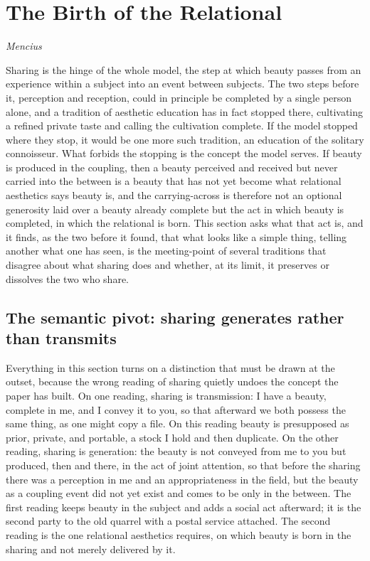 \section{The Birth of the Relational}
\label{p22:sec:sharing}

\epigraph{}{\textit{Mencius}}

\noindent
Sharing is the hinge of the whole model, the step at which beauty passes from an experience within a subject into an event between subjects. The two steps before it, perception and reception, could in principle be completed by a single person alone, and a tradition of aesthetic education has in fact stopped there, cultivating a refined private taste and calling the cultivation complete. If the model stopped where they stop, it would be one more such tradition, an education of the solitary connoisseur. What forbids the stopping is the concept the model serves. If beauty is produced in the coupling, then a beauty perceived and received but never carried into the between is a beauty that has not yet become what relational aesthetics says beauty is, and the carrying-across is therefore not an optional generosity laid over a beauty already complete but the act in which beauty is completed, in which the relational is born. This section asks what that act is, and it finds, as the two before it found, that what looks like a simple thing, telling another what one has seen, is the meeting-point of several traditions that disagree about what sharing does and whether, at its limit, it preserves or dissolves the two who share.

\subsection{The semantic pivot: sharing generates rather than transmits}
\label{p22:sub:sharing-pivot}

Everything in this section turns on a distinction that must be drawn at the outset, because the wrong reading of sharing quietly undoes the concept the paper has built. On one reading, sharing is transmission: I have a beauty, complete in me, and I convey it to you, so that afterward we both possess the same thing, as one might copy a file. On this reading beauty is presupposed as prior, private, and portable, a stock I hold and then duplicate. On the other reading, sharing is generation: the beauty is not conveyed from me to you but produced, then and there, in the act of joint attention, so that before the sharing there was a perception in me and an appropriateness in the field, but the beauty as a coupling event did not yet exist and comes to be only in the between. The first reading keeps beauty in the subject and adds a social act afterward; it is the second party to the old quarrel with a postal service attached. The second reading is the one relational aesthetics requires, on which beauty is born in the sharing and not merely delivered by it.

